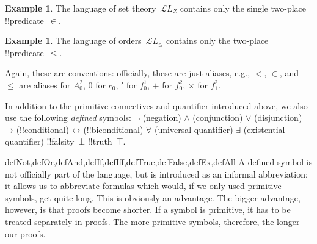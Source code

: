 \documentclass[10pt,a4paper]{article}
\makeatletter
\theoremstyle{plain}
\theoremstyle{definition}
\newtheorem{ex}[thm]{Example}
\theoremstyle{remark}
\newenvironment{explain}{}{}
\providecommand{\lif}{\mathbin{\rightarrow}}
\providecommand{\lforall}{\mathord{\forall}}
\providecommand{\lexists}{\mathord{\exists}}
\providecommand{\ltrue}{\top}
\providecommand{\lfalse}{\bot}
\providecommand{\Obj}{}
\providecommand{\Lang}{\ensuremath{\mathcal{L}}}
\providecommand{\iftag}[1]{#1}
\providecommand{\liff}{\mathbin{\leftrightarrow}}
\providecommand{\iftag}{}
\def\iftag#1#2#3{\iftag@stop{#2}\iftag@more}
\def\iftag@more{\@ifnextchar\bgroup{\iftag@eat}{\relax}}
\def\iftag@eat#1{}
\def\iftag@stop#1{#1}
\makeatother
\begin{document}
\begin{ex}
The language of set theory~$\Lang L_Z$ contains only the single
two-place !!{predicate}~$\in$.
\end{ex}

\begin{ex}
The language of orders~$\Lang L_\le$ contains only the two-place
!!{predicate}~$\le$.
\end{ex}

Again, these are conventions: officially, these are just aliases,
e.g., $<$, $\in$, and $\le$ are aliases for $\Obj A^2_0$, $\Obj 0$ for
$\Obj c_0$, $\prime$ for $\Obj f^1_0$, $+$ for $\Obj f^2_0$, $\times$ for
$\Obj f^2_1$.

\iftag{defNot,defOr,defAnd,defIf,defIff,defTrue,defFalse,defEx,defAll}{%
In addition to the primitive connectives and
\iftag{notprvEx,notprvAll}{quantifier}{quantifiers} introduced
above, we also use the following \emph{defined} symbols:
\startycommalist
  \iftag{defNot}{\ycomma $\lnot$ (negation)}{}%
  \iftag{defAnd}{\ycomma $\land$ (conjunction)}{}%
  \iftag{defOr}{\ycomma $\lor$ (disjunction)}{}%
  \iftag{defIf}{\ycomma $\lif$ (!!{conditional})}{}%
  \iftag{defIff}{\ycomma $\liff$ (!!{biconditional})}{}%
  \iftag{defAll}{\ycomma $\lforall$ (universal quantifier)}{}%
  \iftag{defEx}{\ycomma $\lexists$ (existential quantifier)}{}%
  \iftag{defFalse}{\ycomma !!{falsity}~$\lfalse$}{}%
  \iftag{defTrue}{\ycomma !!{truth}~$\ltrue$}}{}.

\begin{tagblock}{defNot,defOr,defAnd,defIf,defIff,defTrue,defFalse,defEx,defAll}
\begin{explain}
A defined symbol is not officially part of the language, but is
introduced as an informal abbreviation: it allows us to abbreviate
formulas which would, if we only used primitive symbols, get quite
long.  This is obviously an advantage.  The bigger advantage, however,
is that proofs become shorter.  If a symbol is primitive, it has to be
treated separately in proofs. The more primitive symbols, therefore,
the longer our proofs.
\end{explain}
\end{tagblock}

\end{document}
